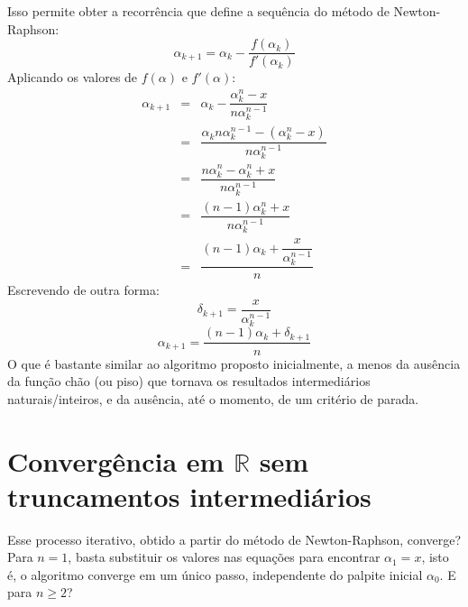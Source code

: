 \documentclass{article}
\begin{document}
Isso permite obter a recorrência
que define a sequência do método de Newton-Raphson:
\[\alpha_{k+1} = \alpha_k - \dfrac{f(\alpha_k)}{f'(\alpha_k)}\]
Aplicando os valores de $f(\alpha)$ e $f'(\alpha)$:
\[
  \begin{array}{rcl}
  \alpha_{k+1}
  &=& \alpha_k - \dfrac{\alpha_k^n - x}{n \alpha_k^{n-1}} \\[5mm]
  &=& \dfrac{\alpha_k n \alpha_k^{n-1}
    - (\alpha_k^n - x)}{n \alpha_k^{n-1}} \\[5mm]
  &=& \dfrac{n \alpha_k^n - \alpha_k^n + x}{n \alpha_k^{n-1}} \\[5mm]
  &=& \dfrac{(n-1) \alpha_k^n + x}{n \alpha_k^{n-1}} \\[5mm]
  &=& \dfrac{(n-1) \alpha_k + \dfrac{x}{\alpha_k^{n-1}}}{n}
  \end{array}
\]
Escrevendo de outra forma:
\[\delta_{k+1} = \dfrac{x}{\alpha_k^{n-1}}\]
\[\alpha_{k+1} = \dfrac{(n-1) \alpha_k + \delta_{k+1}}{n}\]
O que é bastante similar ao algoritmo proposto inicialmente,
a menos da ausência da função chão (ou piso)
que tornava os resultados intermediários naturais/inteiros,
e da ausência, até o momento, de um critério de parada.


\section*{Convergência em $\mathds{R}$ sem truncamentos intermediários}

Esse processo iterativo,
obtido a partir do método de Newton-Raphson,
converge?
Para $n = 1$, basta substituir os valores nas equações
para encontrar $\alpha_1 = x$,
isto é, o algoritmo converge em um único passo,
independente do palpite inicial $\alpha_0$.
E para $n \ge 2$?
\end{document}
